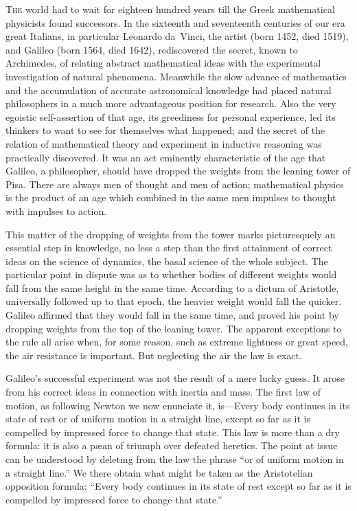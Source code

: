 \documentclass[12pt,leqno]{book}[2005/09/16]
\newcommand{\PageSep}[1]{\ignorespaces}
\newcommand{\First}[1]{\textsc{#1}}
\begin{document}
\First{The} world had to wait for eighteen hundred
years till the Greek mathematical physicists
found successors. In the sixteenth and seventeenth
centuries of our era great Italians, in
particular Leonardo da~Vinci, the artist
%
%
%
(born 1452, died 1519), and Galileo (born 1564,
died 1642), rediscovered the secret, known to
Archimedes, of relating abstract mathematical
ideas with the experimental investigation of
natural phenomena. Meanwhile the slow
advance of mathematics and the accumulation
of accurate astronomical knowledge had
placed natural philosophers in a much more
advantageous position for research. Also the
very egoistic self-assertion of that age, its
greediness for personal experience, led its
thinkers to want to see for themselves what
happened; and the secret of the relation of
mathematical theory and experiment in inductive
reasoning was practically discovered.
It was an act eminently characteristic of the
age that Galileo, a philosopher, should have
\PageSep{43}
dropped the weights from the leaning tower
of Pisa. There are always men of thought
and men of action; mathematical physics is
the product of an age which combined in the
same men impulses to thought with impulses
to action.

This matter of the dropping of weights from
%
the tower marks picturesquely an essential
step in knowledge, no less a step than the
first attainment of correct ideas on the science
of dynamics, the basal science of the whole
subject. The particular point in dispute was
as to whether bodies of different weights
would fall from the same height in the same
time. According to a dictum of Aristotle,
universally followed up to that epoch, the
heavier weight would fall the quicker. Galileo
affirmed that they would fall in the same
time, and proved his point by dropping
weights from the top of the leaning tower.
The apparent exceptions to the rule all arise
when, for some reason, such as extreme lightness
or great speed, the air resistance is important.
But neglecting the air the law is
exact.

Galileo's successful experiment was not the
%
result of a mere lucky guess. It arose from
his correct ideas in connection with inertia
and mass. The first law of motion, as following
Newton we now enunciate it, is---Every
%
body continues in its state of rest or of uniform
\PageSep{44}
motion in a straight line, except so far
as it is compelled by impressed force to
change that state. This law is more than a
dry formula: it is also a pæan of triumph
over defeated heretics. The point at issue
can be understood by deleting from the law
the phrase ``or of uniform motion in a straight
line.'' We there obtain what might be taken
as the Aristotelian opposition formula:
``Every body continues in its state of rest
except so far as it is compelled by impressed
force to change that state.''
\end{document}
